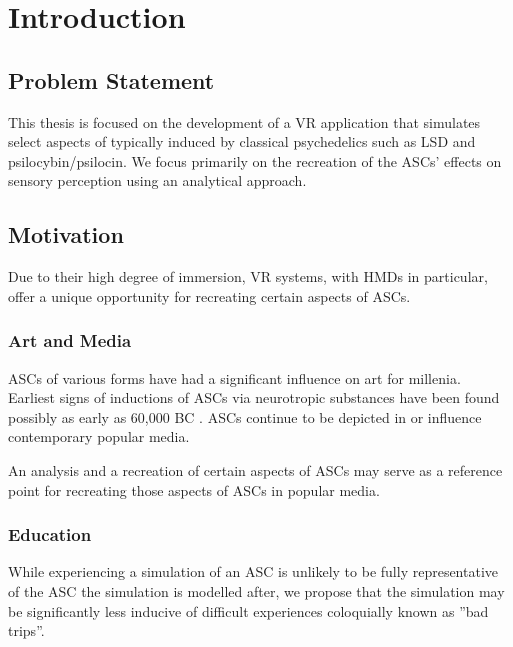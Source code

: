 \chapter{Introduction}
\vspace{-1.6em}
%

\minitoc
\thispagestyle{empty}
\newpage

\section{Problem Statement}
This thesis is focused on the development of a \ac{VR} application that simulates select aspects of  typically induced by classical psychedelics such as LSD and psilocybin/psilocin.
We focus primarily on the recreation of the \acp{ASC}' effects on sensory perception using an analytical approach.

\section{Motivation}
Due to their high degree of immersion, \ac{VR} systems, with \acp{HMD} in particular, offer a unique opportunity for recreating certain aspects of \acp{ASC}.

\subsection{Art and Media}
\Acp{ASC} of various forms have had a significant influence on art for millenia. Earliest signs of inductions of \acp{ASC} via neurotropic substances have been found possibly as early as 60,000 BC \autocite{guerra2015psychoactive}. \Acp{ASC} continue to be depicted in or influence contemporary popular media.

An analysis and a recreation of certain aspects of \acp{ASC} may serve as a reference point for recreating those aspects of \acp{ASC} in popular media.

\subsection{Education}
While experiencing a simulation of an \ac{ASC} is unlikely to be fully representative of the \ac{ASC} the simulation is modelled after, we propose that the simulation may be significantly less inducive of difficult experiences coloquially known as ''bad trips''.

